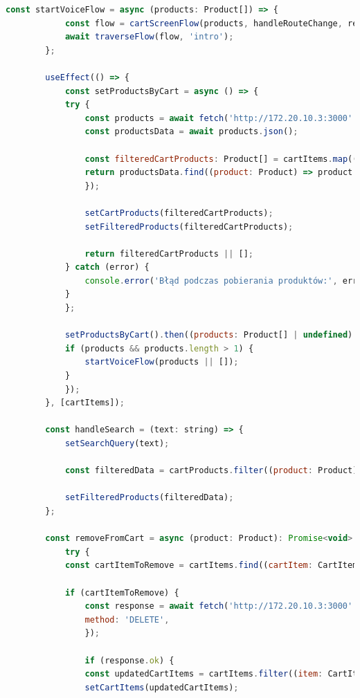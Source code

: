 \begin{lstlisting}[language=JavaScript, caption=Koszyk użytkownika implementacja, label=lst:service]
        const startVoiceFlow = async (products: Product[]) => {
            const flow = cartScreenFlow(products, handleRouteChange, removeFromCart);
            await traverseFlow(flow, 'intro');
        };

        useEffect(() => {
            const setProductsByCart = async () => {
            try {
                const products = await fetch('http://172.20.10.3:3000' + `/products`);
                const productsData = await products.json();

                const filteredCartProducts: Product[] = cartItems.map((cartItem: CartItem) => {
                return productsData.find((product: Product) => product.product_id === cartItem.product_id);
                });

                setCartProducts(filteredCartProducts);
                setFilteredProducts(filteredCartProducts);

                return filteredCartProducts || [];
            } catch (error) {
                console.error('Błąd podczas pobierania produktów:', error);
            }
            };

            setProductsByCart().then((products: Product[] | undefined) => {
            if (products && products.length > 1) {
                startVoiceFlow(products || []);
            }
            });
        }, [cartItems]);

        const handleSearch = (text: string) => {
            setSearchQuery(text);

            const filteredData = cartProducts.filter((product: Product) => product.name.toLowerCase().includes(text.toLowerCase()));

            setFilteredProducts(filteredData);
        };

        const removeFromCart = async (product: Product): Promise<void> => {
            try {
            const cartItemToRemove = cartItems.find((cartItem: CartItem) => cartItem.product_id === product.product_id);

            if (cartItemToRemove) {
                const response = await fetch('http://172.20.10.3:3000' + `/cart-items/${cartItemToRemove.cart_item_id}`, {
                method: 'DELETE',
                });

                if (response.ok) {
                const updatedCartItems = cartItems.filter((item: CartItem) => item.cart_item_id !== cartItemToRemove.cart_item_id);
                setCartItems(updatedCartItems);


\end{lstlisting}
